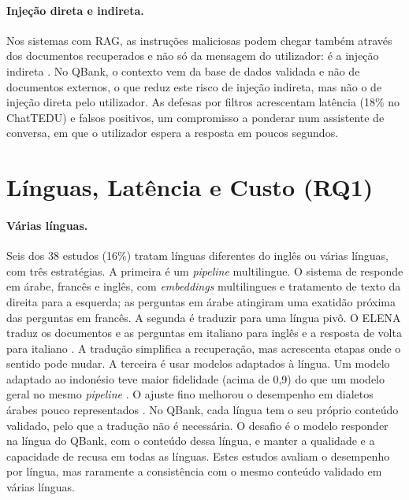 \paragraph{Injeção direta e indireta.} Nos sistemas com \gls{RAG}, as instruções maliciosas podem chegar também através dos documentos recuperados e não só da mensagem do utilizador: é a injeção indireta \parencite{emekci2025securing}. No QBank, o contexto vem da base de dados validada e não de documentos externos, o que reduz este risco de injeção indireta, mas não o de injeção direta pelo utilizador. As defesas por filtros acrescentam latência (18\% no ChatTEDU) e falsos positivos, um compromisso a ponderar num assistente de conversa, em que o utilizador espera a resposta em poucos segundos.

\section{Línguas, Latência e Custo (RQ1)}
\label{sec:chap2_syn_tradeoffs}

\paragraph{Várias línguas.} Seis dos 38 estudos (16\%) tratam línguas diferentes do inglês ou várias línguas, com três estratégias. A primeira é um \emph{pipeline} multilingue. O sistema de \textcite{sbai2025advanced} responde em árabe, francês e inglês, com \emph{embeddings} multilingues e tratamento de texto da direita para a esquerda; as perguntas em árabe atingiram uma exatidão próxima das perguntas em francês. A segunda é traduzir para uma língua pivô. O ELENA traduz os documentos e as perguntas em italiano para inglês e a resposta de volta para italiano \parencite{ruga2025conversational}. A tradução simplifica a recuperação, mas acrescenta etapas onde o sentido pode mudar. A terceira é usar modelos adaptados à língua. Um modelo adaptado ao indonésio teve maior fidelidade (acima de 0,9) do que um modelo geral no mesmo \emph{pipeline} \parencite{nurfadhilah2025retrieval}. O ajuste fino melhorou o desempenho em dialetos árabes pouco representados \parencite{abrar2025domain}. No QBank, cada língua tem o seu próprio conteúdo validado, pelo que a tradução não é necessária. O desafio é o modelo responder na língua do QBank, com o conteúdo dessa língua, e manter a qualidade e a capacidade de recusa em todas as línguas. Estes estudos avaliam o desempenho por língua, mas raramente a consistência com o mesmo conteúdo validado em várias línguas.

